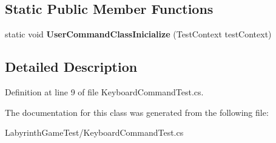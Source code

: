 \subsection*{Static Public Member Functions}
\begin{DoxyCompactItemize}
\item 
\hypertarget{class_labyrinth_game_test_1_1_keyboard_command_test_accb84cddfe4787fb6896649cf0efda02}{static void {\bfseries User\+Command\+Class\+Inicialize} (Test\+Context test\+Context)}\label{class_labyrinth_game_test_1_1_keyboard_command_test_accb84cddfe4787fb6896649cf0efda02}

\end{DoxyCompactItemize}


\subsection{Detailed Description}


Definition at line 9 of file Keyboard\+Command\+Test.\+cs.



The documentation for this class was generated from the following file\+:\begin{DoxyCompactItemize}
\item 
Labyrinth\+Game\+Test/Keyboard\+Command\+Test.\+cs\end{DoxyCompactItemize}
